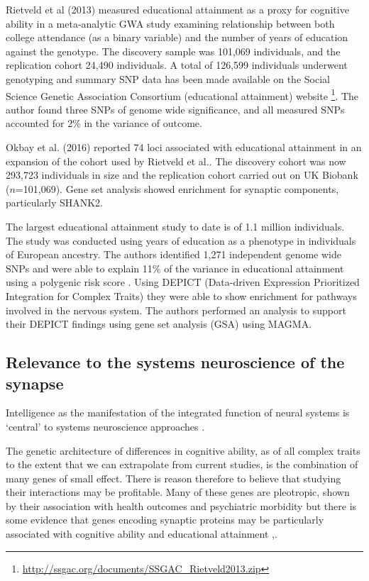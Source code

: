 Rietveld et al (2013)\cite{rietveld2013gwas} measured educational attainment as a proxy for cognitive ability in a  meta-analytic GWA study examining relationship between both college attendance (as a binary variable) and the number of years of education against the genotype. The discovery sample was 101,069 individuals, and the replication cohort 24,490 individuals. A total of 126,599 individuals underwent genotyping and summary SNP data has been made available on the Social Science Genetic Association Consortium (educational attainment) website \footnote{\url{http://ssgac.org/documents/SSGAC_Rietveld2013.zip} }. The author found three SNPs of genome wide significance, and all measured SNPs accounted for 2\% in the variance of outcome\cite{rietveld2013gwas}.

Okbay et al. (2016) \cite{okbay2016genome} reported 74 loci associated with educational attainment in an expansion of the cohort used by Rietveld et al.\cite{rietveld2013gwas}. The discovery cohort was now 293,723 individuals in size and the replication cohort carried out on UK Biobank ($n$=101,069). Gene set analysis showed enrichment for synaptic components, particularly SHANK2.

The largest educational attainment study to date is of 1.1 million individuals\cite{lee2018gene}. The study was conducted using years of education as a phenotype in individuals of European ancestry. The authors identified 1,271 independent genome wide SNPs and were able to explain 11\% of the variance in educational attainment using a polygenic risk score \cite{lee2018gene} . Using DEPICT (Data-driven Expression Prioritized Integration for Complex Traits) they were able to show enrichment for pathways involved in the nervous system\cite{pers2015biological}. The authors performed an analysis to support their DEPICT findings using gene set analysis (GSA) using MAGMA. 


\subsection{Relevance to the systems neuroscience of the synapse}
Intelligence as the manifestation of the integrated function of neural systems is ‘central’ to systems neuroscience approaches  \cite{plomin2015genetics}.

The genetic architecture of differences in cognitive ability, as of all complex traits to the extent that we can extrapolate from current studies, is the combination of many genes of small effect\cite{plomin2015genetics}. %
There is reason therefore to believe that studying their interactions may be profitable.
Many of these genes are pleotropic, shown by their association with health outcomes \cite{deary2008intelligent} and psychiatric morbidity\cite{hill2016age} but there is some evidence that genes encoding synaptic proteins may be particularly associated with cognitive ability and educational attainment \cite{hill2014human},\cite{okbay2016genome}.


